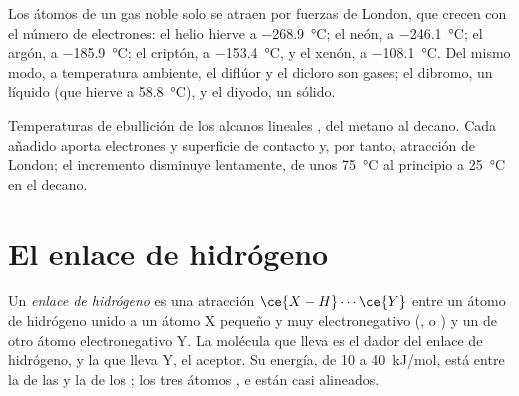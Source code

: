 \begin{example}\label{ex:b1:intermolecular-forces-solvents:noble}
Los átomos de un gas noble solo se atraen por fuerzas de London, que
crecen con el número de electrones: el helio hierve a
\qty{-268.9}{\celsius}; el neón, a \qty{-246.1}{\celsius}; el argón, a
\qty{-185.9}{\celsius}; el criptón, a \qty{-153.4}{\celsius}, y el xenón,
a \qty{-108.1}{\celsius}. Del mismo modo, a temperatura ambiente, el
diflúor y el dicloro son gases; el dibromo, un líquido (que hierve a
\qty{58.8}{\celsius}), y el diyodo, un sólido.
\end{example}

\begin{omfigure}

{\small Temperaturas de ebullición de los alcanos lineales
, del metano al decano. Cada  añadido aporta
electrones y superficie de contacto y, por tanto, atracción de London;
el incremento disminuye lentamente, de unos \qty{75}{\celsius} al
principio a \qty{25}{\celsius} en el decano.}
\end{omfigure}

\section{El enlace de hidrógeno}

\begin{definition}\label{def:b1:intermolecular-forces-solvents:hbond}
Un \emph{enlace de hidrógeno} es una atracción
$\ce{X-H}\cdots\ce{Y}$ entre un átomo de hidrógeno unido a un átomo X
pequeño y muy electronegativo (,  o ) y un  de otro átomo electronegativo Y. La molécula que lleva 
es el dador del enlace de hidrógeno, y la que lleva Y, el aceptor. Su
energía, de 10 a \qty{40}{kJ/mol}, está entre la de las  y la de los ; los tres átomos ,
 e  están casi alineados.
\end{definition}

